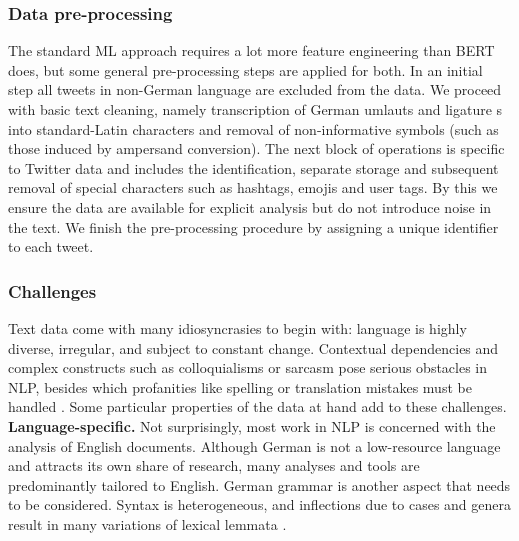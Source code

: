 
\subsubsection{Data pre-processing}
\label{data_preproc}

The standard ML approach requires a lot more feature engineering 
than BERT does, but some general pre-processing steps are applied for both.
In an initial step all tweets in non-German language are excluded from the data.
We proceed with basic text cleaning, namely transcription of 
German umlauts and ligature s into standard-Latin characters and removal of 
non-informative symbols (such as those induced by ampersand conversion). 
The next block of operations is specific to Twitter data and includes the 
identification, separate storage and subsequent removal of special characters 
such as hashtags, emojis and user tags.
By this we ensure the data are available for explicit analysis but do not 
introduce noise in the text.
We finish the pre-processing procedure by assigning a unique identifier to 
each tweet.


\subsubsection{Challenges}
\label{challenges}

Text data come with many idiosyncrasies to begin with: language is highly 
diverse, irregular, and subject to constant change.
Contextual dependencies and complex constructs such as colloquialisms or sarcasm 
pose serious obstacles in NLP, besides which profanities like spelling or 
translation mistakes must be handled \citep{mohammad2017}.
Some particular properties of the data at hand add to these challenges.
\\

\textbf{Language-specific.}
Not surprisingly, most work in NLP is concerned with the analysis of 
English documents.
Although German is not a low-resource language and attracts its own share of 
research, many analyses and tools are predominantly tailored to English.
German grammar is another aspect that needs to be considered.
Syntax is heterogeneous, and inflections due to cases and genera 
result in many variations of lexical lemmata \citep{rauh2018}.
\\

